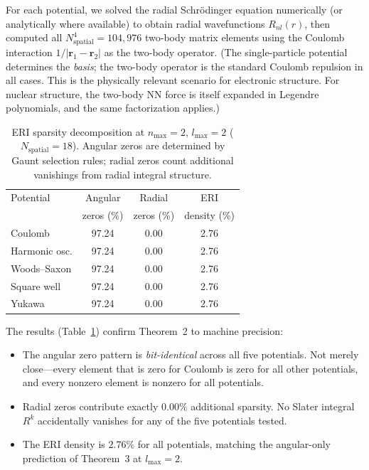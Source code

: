 \documentclass[twocolumn,pra,amsmath,amssymb,superscriptaddress]{revtex4-2}
\begin{document}
For each potential, we solved the radial Schr\"odinger equation
numerically (or analytically where available) to obtain radial
wavefunctions $R_{nl}(r)$, then computed all
$N_{\mathrm{spatial}}^4 = 104{,}976$ two-body matrix elements using
the Coulomb interaction $1/|\mathbf{r}_1 - \mathbf{r}_2|$ as the
two-body operator.  (The single-particle potential determines the
\textit{basis}; the two-body operator is the standard Coulomb
repulsion in all cases.  This is the physically relevant scenario
for electronic structure.  For nuclear structure, the two-body NN
force is itself expanded in Legendre polynomials, and the same
factorization applies.)

\begin{table}[b]
\caption{ERI sparsity decomposition at $n_{\max}=2$, $l_{\max}=2$
($N_{\mathrm{spatial}} = 18$).  Angular zeros are determined by
Gaunt selection rules; radial zeros count additional vanishings from
radial integral structure.}
\label{tab:sparsity}
\begin{ruledtabular}
\begin{tabular}{lccc}
Potential & Angular & Radial & ERI \\
          & zeros (\%) & zeros (\%) & density (\%) \\
\midrule
Coulomb        & 97.24 & 0.00 & 2.76 \\
Harmonic osc.  & 97.24 & 0.00 & 2.76 \\
Woods--Saxon   & 97.24 & 0.00 & 2.76 \\
Square well    & 97.24 & 0.00 & 2.76 \\
Yukawa         & 97.24 & 0.00 & 2.76 \\
\end{tabular}
\end{ruledtabular}
\end{table}

The results (Table~\ref{tab:sparsity}) confirm Theorem~2 to machine
precision:

\begin{itemize}
\item The angular zero pattern is \textit{bit-identical} across all
  five potentials.  Not merely close---every element that is zero
  for Coulomb is zero for all other potentials, and every nonzero
  element is nonzero for all potentials.
\item Radial zeros contribute exactly $0.00\%$ additional sparsity.
  No Slater integral $R^k$ accidentally vanishes for any of the five
  potentials tested.
\item The ERI density is $2.76\%$ for all potentials, matching the
  angular-only prediction of Theorem~3 at $l_{\max}=2$.
\end{itemize}
\end{document}
